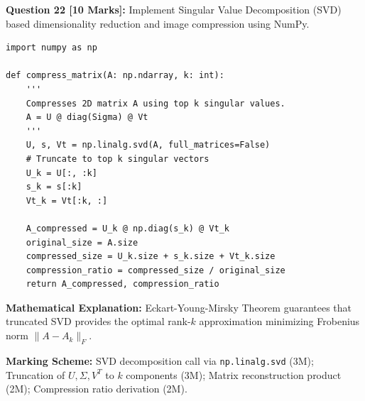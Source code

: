 \noindent\textbf{Question 22 [10 Marks]:} Implement Singular Value Decomposition (SVD) based dimensionality reduction and image compression using NumPy.
\begin{solutionbox}
\begin{lstlisting}
import numpy as np

def compress_matrix(A: np.ndarray, k: int):
    '''
    Compresses 2D matrix A using top k singular values.
    A = U @ diag(Sigma) @ Vt
    '''
    U, s, Vt = np.linalg.svd(A, full_matrices=False)
    # Truncate to top k singular vectors
    U_k = U[:, :k]
    s_k = s[:k]
    Vt_k = Vt[:k, :]
    
    A_compressed = U_k @ np.diag(s_k) @ Vt_k
    original_size = A.size
    compressed_size = U_k.size + s_k.size + Vt_k.size
    compression_ratio = compressed_size / original_size
    return A_compressed, compression_ratio
\end{lstlisting}
\textbf{Mathematical Explanation:} Eckart-Young-Mirsky Theorem guarantees that truncated SVD provides the optimal rank-$k$ approximation minimizing Frobenius norm $\|A - A_k\|_F$.
\end{solutionbox}
\begin{markingrubric}
\textbf{Marking Scheme:} SVD decomposition call via \texttt{np.linalg.svd} (3M); Truncation of $U, \Sigma, V^T$ to $k$ components (3M); Matrix reconstruction product (2M); Compression ratio derivation (2M).
\end{markingrubric}


